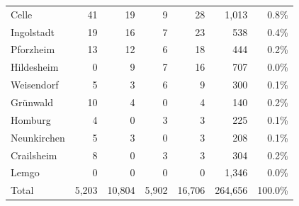 \begin{tabular}{lrrrrrr}
Celle & 41 & 19 & 9 & 28 & 1,013 & 0.8\%\\
Ingolstadt & 19 & 16 & 7 & 23 & 538 & 0.4\%\\
Pforzheim & 13 & 12 & 6 & 18 & 444 & 0.2\%\\
Hildesheim & 0 & 9 & 7 & 16 & 707 & 0.0\%\\
Weisendorf & 5 & 3 & 6 & 9 & 300 & 0.1\%\\
Gr\"unwald & 10 & 4 & 0 & 4 & 140 & 0.2\%\\
Homburg & 4 & 0 & 3 & 3 & 225 & 0.1\%\\
Neunkirchen & 5 & 3 & 0 & 3 & 208 & 0.1\%\\
Crailsheim & 8 & 0 & 3 & 3 & 304 & 0.2\%\\
Lemgo & 0 & 0 & 0 & 0 & 1,346 & 0.0\%\\
\midrule
Total & 5,203 & 10,804 & 5,902 & 16,706 & 264,656 & 100.0\%\\
\bottomrule
\end{tabular}